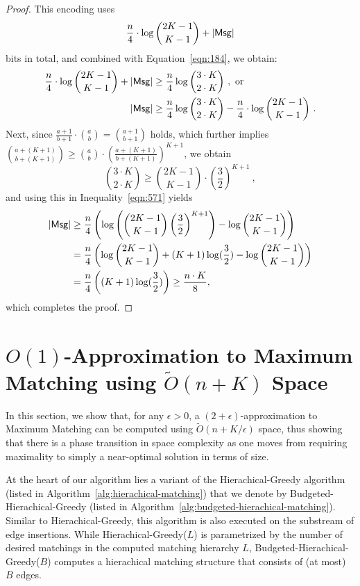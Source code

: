 \documentclass[11pt,a4paper]{article}
\begin{document}
\begin{proof}
This encoding uses
\begin{align}
  \frac{n}{4} \cdot \log {2K-1 \choose K-1} + |{\sf Msg}|  \label{eqn:431}
\end{align}
bits in total, and combined with Equation~\ref{eqn:184}, we obtain:
\begin{align}
 \frac{n}{4} \cdot \log {2K-1 \choose K-1} + |{\sf Msg}| & \ge \frac{n}{4} \log {3 \cdot K \choose 2 \cdot K} \ , \mbox{ or} \nonumber \\
 |{\sf Msg}| & \ge \frac{n}{4} \log {3 \cdot K \choose 2 \cdot K} - \frac{n}{4} \cdot \log {2K-1 \choose K-1} \ . \label{eqn:571}
\end{align}
Next, since $\frac{a+1}{b+1} \cdot {a \choose b} = {a+1 \choose b+1}$ holds, which further implies ${a+(K+1) \choose b+(K+1)} \ge {a \choose b} \cdot \left( \frac{a+(K+1)}{b+(K+1)} \right)^{K+1}$, we obtain 
$${3 \cdot K \choose 2 \cdot K} \ge {2K - 1 \choose K-1} \cdot \left(\frac{3}{2}\right)^{K+1} \ , $$
and using this in Inequality~\ref{eqn:571} yields
\begin{align*}
 |{\sf Msg}| & \ge \frac{n}{4} \left( \log \left( {2K-1 \choose K-1} \left(\frac{3}{2} \right)^{K+1} \right)  -  \log  {2K-1 \choose K-1}  \right) \\
 & = \frac{n}{4} \left( \log  {2K-1 \choose K-1} + (K+1) \log(\frac{3}{2})   -  \log  {2K-1 \choose K-1}  \right) \\
 & = \frac{n}{4} \left(  (K+1) \log(\frac{3}{2})    \right) \ge \frac{n \cdot K}{8} ,
\end{align*}
which completes the proof.
\end{proof}


\section{$O(1)$-Approximation to \textsf{Maximum Matching} using $\tilde{O}(n + K)$ Space} \label{sec:maximum-matching}

In this section, we show that, for any $\epsilon > 0$, a $(2+\epsilon)$-approximation to \textsf{Maximum Matching} can be computed using $\tilde{O}(n+K/\epsilon)$ space, thus showing that there is a phase transition in space complexity as one moves from requiring maximality to simply a near-optimal solution in terms of size.

At the heart of our algorithm lies a variant of the \textsf{Hierachical-Greedy} algorithm (listed in Algorithm~\ref{alg:hierachical-matching}) that we denote by \textsf{Budgeted-Hierachical-Greedy} (listed in Algorithm~\ref{alg:budgeted-hierachical-matching}). Similar to \textsf{Hierachical-Greedy}, this algorithm is also executed on the substream of edge insertions. While \textsf{Hierachical-Greedy($L$)} is parametrized by the number of desired matchings in the computed matching hierarchy $L$, \textsf{Budgeted-Hierachical-Greedy($B$)} computes a hierachical matching structure that consists of  (at most) $B$ edges.
\end{document}
